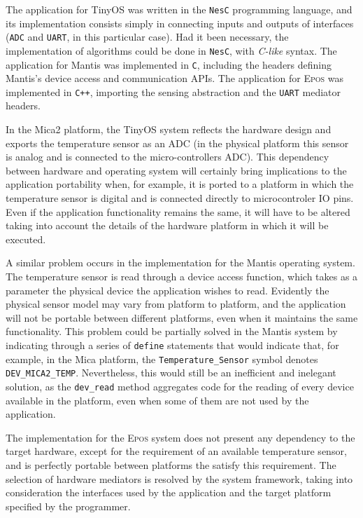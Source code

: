 


The application for TinyOS was written in the \texttt{NesC}
programming language, and its implementation consists simply in
connecting inputs and outputs of interfaces (\texttt{ADC} and
\texttt{UART}, in this particular case). Had it been necessary, the
implementation of algorithms could be done in \texttt{NesC}, with
\emph{C-like} syntax. The application for Mantis was implemented in
\texttt{C}, including the headers defining Mantis's device access and
communication APIs. The application for \textsc{Epos} was implemented
in \texttt{C++}, importing the sensing abstraction and the
\texttt{UART} mediator headers.

In the Mica2 platform, the TinyOS system reflects the hardware design
and exports the temperature sensor as an ADC (in the physical platform 
this sensor is analog and is connected to the micro-controllers ADC). 
This dependency between hardware and operating system will certainly 
bring implications to the application portability when, for example,
it is ported to a platform in which the temperature sensor is digital
and is connected directly to microcontroler IO pins. Even if the application
functionality remains the same, it will have to be altered taking into
account the details of the hardware platform in which it will be executed.

A similar problem occurs in the implementation for the Mantis
operating system. The temperature sensor is read through a device
access function, which takes as a parameter the physical device the
application wishes to read. Evidently the physical sensor model may
vary from platform to platform, and the application will not be
portable between different platforms, even when it maintains the same
functionality. This problem could be partially solved in the Mantis
system by indicating through a series of \texttt{define} statements
that would indicate that, for example, in the Mica platform, the
\texttt{Temperature\_Sensor} symbol denotes \texttt{DEV\_MICA2\_TEMP}.
Nevertheless, this would still be an inefficient and inelegant solution,
as the \texttt{dev\_read} method aggregates code for the reading
of every device available in the platform, even when some of them
are not used by the application.

The implementation for the \textsc{Epos} system does not present
any dependency to the target hardware, except for the requirement of
an available temperature sensor, and is perfectly portable between 
platforms the satisfy this requirement. The selection of hardware
mediators is resolved by the system framework, taking into consideration
the interfaces used by the application and the target platform 
specified by the programmer.

